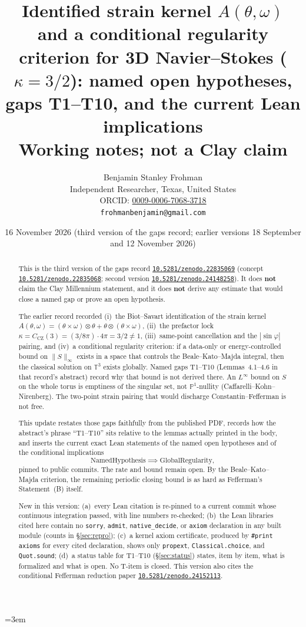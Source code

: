 \documentclass[11pt]{article}
\title{Identified strain kernel \(A(\theta,\omega)\) and a conditional regularity criterion for 3D Navier--Stokes (\(\kappa=3/2\)): named open hypotheses, gaps T1--T10, and the current Lean implications\\
\large Working notes; not a Clay claim}
\author{Benjamin Stanley Frohman\\
Independent Researcher, Texas, United States\\
ORCID: \href{https://orcid.org/0009-0006-7068-3718}{0009-0006-7068-3718}\\
\texttt{frohmanbenjamin@gmail.com}}
\date{16 November 2026 (third version of the gaps record; earlier versions 18 September and 12 November 2026)}
\theoremstyle{plain}
\theoremstyle{definition}
\theoremstyle{remark}
\newcommand{\Tthree}{\mathbb{T}^{3}}
\newcommand{\doi}[1]{\href{https://doi.org/#1}{\texttt{#1}}}
\begin{document}
\emergencystretch=3em
\maketitle

\begin{abstract}
This is the third version of the gaps record \doi{10.5281/zenodo.22835069} (concept \doi{10.5281/zenodo.22835068}; second version \doi{10.5281/zenodo.24148258}). It does \textbf{not} claim the Clay Millennium statement, and it does \textbf{not} derive any estimate that would close a named gap or prove an open hypothesis.

The earlier record recorded (i)~the Biot--Savart identification of the strain kernel \(A(\theta,\omega)=(\theta\times\omega)\otimes\theta+\theta\otimes(\theta\times\omega)\), (ii)~the prefactor lock \(\kappa=C_{\mathrm{CZ}}(3)=(3/8\pi)\cdot 4\pi=3/2\neq 1\), (iii)~same-point cancellation and the \(|\sin\varphi|\) pairing, and (iv)~a conditional regularity criterion: if a data-only or energy-controlled bound on \(\|S\|_{\infty}\) exists in a space that controls the Beale--Kato--Majda integral, then the classical solution on \(\Tthree\) exists globally. Named gaps T1--T10 (Lemmas~4.1--4.6 in that record's abstract) record why that bound is not derived there. An \(L^{\infty}\) bound on \(S\) on the whole torus is emptiness of the singular set, not \(\mathbb{P}^{1}\)-nullity (Caffarelli--Kohn--Nirenberg). The two-point strain pairing that would discharge Constantin--Fefferman is not free.

This update restates those gaps faithfully from the published PDF, records how the abstract's phrase ``T1--T10'' sits relative to the lemmas actually printed in the body, and inserts the current exact Lean statements of the named open hypotheses and of the conditional implications
\[
\text{NamedHypothesis}\implies\text{GlobalRegularity},
\]
pinned to public commits. The rate and bound remain open. By the Beale--Kato--Majda criterion, the remaining periodic closing bound is as hard as Fefferman's Statement~(B) itself.

New in this version: (a)~every Lean citation is re-pinned to a current commit whose continuous integration passed, with line numbers re-checked; (b)~the Lean libraries cited here contain no \texttt{sorry}, \texttt{admit}, \texttt{native\_decide}, or \texttt{axiom} declaration in any built module (counts in \S\ref{sec:repro}); (c)~a kernel axiom certificate, produced by \texttt{\#print axioms} for every cited declaration, shows only \texttt{propext}, \texttt{Classical.choice}, and \texttt{Quot.sound}; (d)~a status table for T1--T10 (\S\ref{sec:status}) states, item by item, what is formalized and what is open. No T-item is closed. This version also cites the conditional Fefferman reduction paper \doi{10.5281/zenodo.24152113}.
\end{abstract}
\end{document}
